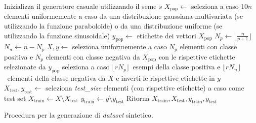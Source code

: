 \begin{algorithm}
    \SetAlgoLined
    Inizializza il generatore casuale utilizzando il seme $s$\;
    $X_{\text{pop}} \gets$ seleziona a caso $10n$ elementi uniformemente a caso da una distribuzione gaussiana multivariata (se utilizzando la funzione paraboloide) o da una distribuzione uniforme (se utilizzando la funzione sinusoidale)\;
    $y_{\text{pop}} \gets$ etichette dei vettori $X_{\text{pop}}$\;
    $N_p \gets \lfloor\frac{n}{p + 1}\rfloor$\;
    $N_n \gets n - N_p$\;
    $X, y \gets$ seleziona uniformemente a caso $N_p$ elementi con classe positiva e $N_p$ elementi con classe negativa da $X_{\text{pop}}$ con le rispettive etichette selezionate da $y_{\text{pop}}$\;   
    seleziona a caso $\lfloor rN_p \rfloor$\ esempi della classe positiva e $\lfloor r  N_n \rfloor$\ elementi della classe negativa da $X$ e inverti le rispettive etichette in $y$\;
    $X_{\text{test}}, y_{\text{test}} \gets$ seleziona \emph{test\_size} elementi (con rispettive etichette) a caso come test set\;
    $X_{\text{train}} \gets X \setminus X_{\text{test}}$\;
    $y_{\text{train}} \gets y \setminus y_{\text{test}}$\;
    Ritorna $X_{\text{train}}, X_{\text{test}}, y_{\text{train}}, y_{\text{test}}$\;
\caption{Procedura per la generazione di \emph{dataset} sintetico.}
\label{alg:generazione_dataset_sintetici}
\end{algorithm}

